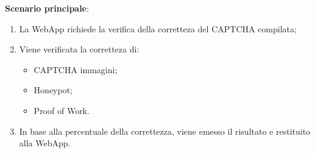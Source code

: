 \textbf{Scenario principale}:
\begin{enumerate}
    \item La WebApp richiede la verifica della corretteza del CAPTCHA compilata;
    \item Viene verificata la corretteza di:
    \begin{itemize}
		\item CAPTCHA immagini;
		\item Honeypot;
		\item Proof of Work.
    \end{itemize}
    \item In base alla percentuale della correttezza, viene emesso il risultato e restituito alla WebApp.
\end{enumerate}
